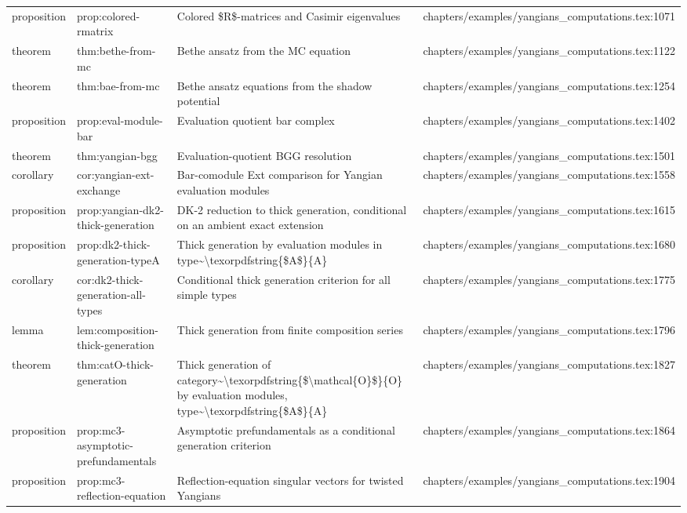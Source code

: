 \documentclass[11pt]{article}
\begin{document}
\begin{longtable}{L{0.10\textwidth}L{0.26\textwidth}L{0.42\textwidth}L{0.22\textwidth}}
proposition & prop:colored-rmatrix & Colored \$R\$-matrices and Casimir eigenvalues & chapters/examples/yangians\_computations.tex:1071\\
theorem & thm:bethe-from-mc & Bethe ansatz from the MC equation & chapters/examples/yangians\_computations.tex:1122\\
theorem & thm:bae-from-mc & Bethe ansatz equations from the shadow potential & chapters/examples/yangians\_computations.tex:1254\\
proposition & prop:eval-module-bar & Evaluation quotient bar complex & chapters/examples/yangians\_computations.tex:1402\\
theorem & thm:yangian-bgg & Evaluation-quotient BGG resolution & chapters/examples/yangians\_computations.tex:1501\\
corollary & cor:yangian-ext-exchange & Bar-comodule Ext comparison for Yangian evaluation modules & chapters/examples/yangians\_computations.tex:1558\\
proposition & prop:yangian-dk2-thick-generation & DK-2 reduction to thick generation, cond{}itional on an ambient exact extension & chapters/examples/yangians\_computations.tex:1615\\
proposition & prop:dk2-thick-generation-typeA & Thick generation by evaluation modules in type\textasciitilde{}\textbackslash{}texorpdfstring\{\$A\$\}\{A\} & chapters/examples/yangians\_computations.tex:1680\\
corollary & cor:dk2-thick-generation-all-types & Cond{}itional thick generation criterion for all simple types & chapters/examples/yangians\_computations.tex:1775\\
lemma & lem:composition-thick-generation & Thick generation from finite composition series & chapters/examples/yangians\_computations.tex:1796\\
theorem & thm:catO-thick-generation & Thick generation of category\textasciitilde{}\textbackslash{}texorpdfstring\{\$\textbackslash{}mathcal\{O\}\$\}\{O\} by evaluation modules, type\textasciitilde{}\textbackslash{}texorpdfstring\{\$A\$\}\{A\} & chapters/examples/yangians\_computations.tex:1827\\
proposition & prop:mc3-asymptotic-prefundamentals & Asymptotic prefundamentals as a cond{}itional generation criterion & chapters/examples/yangians\_computations.tex:1864\\
proposition & prop:mc3-reflection-equation & Reflection-equation singular vectors for twisted Yangians & chapters/examples/yangians\_computations.tex:1904\\

\end{longtable}
\end{document}
